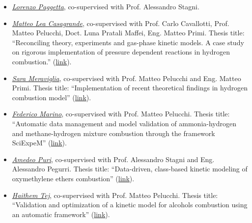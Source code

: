 
\begin{itemize}
    \item [ ] \ul{\it Lorenzo Paggetta}, co-supervised with Prof. Alessandro Stagni.

    \item [ ] \ul{\it Matteo Lea Casagrande}, co-supervised with Prof. Carlo Cavallotti,
          Prof. Matteo Pelucchi, Doct. Luna Pratali Maffei, Eng. Matteo Primi. Thesis title:
          ``Reconciling theory, experiments and gas-phase kinetic models. A case study on
          rigorous implementation of pressure dependent reactions in hydrogen combustion.''
          (\href{https://hdl.handle.net/10589/226533}{link}).

    \item [ ] \ul{\it Sara Meraviglia}, co-supervised with Prof. Matteo Pelucchi and Eng.
          Matteo Primi. Thesis title: ``Implementation of recent theoretical findings in
          hydrogen combustion model'' (\href{https://hdl.handle.net/10589/214934}{link}).

    \item [ ] \ul{\it Federico Marino}, co-supervised with Prof. Matteo Pelucchi. Thesis
          title: ``Automatic data management and model validation of ammonia-hydrogen and
          methane-hydrogen mixture combustion through the framework SciExpeM''
          (\href{https://hdl.handle.net/10589/212616}{link}).

    \item [ ] \ul{\it Amedeo Puri}, co-supervised with Prof. Alessandro Stagni and Eng.
          Alessandro Pegurri. Thesis title: ``Data-driven, class-based kinetic modeling of
          oxymethylene ethers combustion'' (\href{https://hdl.handle.net/10589/206686}{link}).

    \item [ ] \ul{\it Haithem Tej}, co-supervised with Prof. Matteo Pelucchi. Thesis title:
          ``Validation and optimization of a kinetic model for alcohols combustion using an
          automatic framework'' (\href{https://hdl.handle.net/10589/210401}{link}).

\end{itemize}
